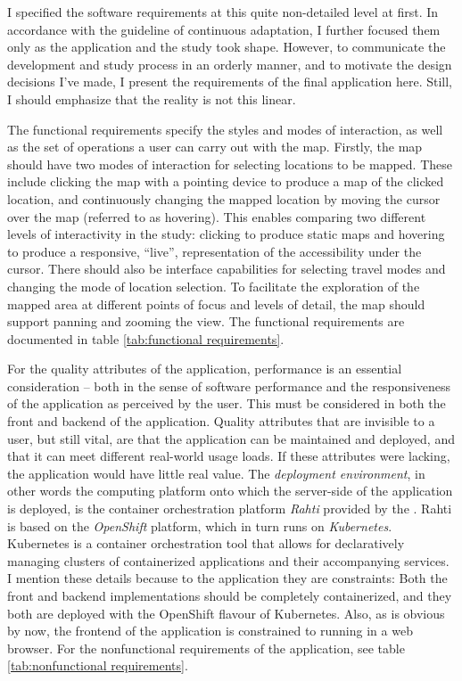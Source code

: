 I specified the software requirements at this quite non-detailed
level at first.
In accordance with the guideline of continuous adaptation,
\parencite{bec2001} I further focused them only as the application
and the study took shape.
However, to communicate the development and study process in an orderly manner,
and to motivate the design decisions I've made,
I present the requirements of the final application here.
Still, I should emphasize that the reality is not this linear.

The functional requirements specify the styles and modes of interaction,
as well as the set of operations a user can carry out with the map.
Firstly, the map should have two modes of interaction for selecting locations to be mapped.
These include clicking the map with a pointing device to produce a map of the clicked location,
and continuously changing the mapped location by moving the cursor over the map
(referred to as hovering).
This enables comparing two different levels of interactivity in the study:
clicking to produce static maps and hovering to produce
a responsive, \enquote{live},
representation of the accessibility under the cursor.
There should also be interface capabilities for selecting travel modes
and changing the mode of location selection.
To facilitate the exploration of the mapped area
at different points of focus and levels of detail,
the map should support panning and zooming the view.
The functional requirements are documented in table \ref{tab:functional requirements}.

For the quality attributes of the application,
performance is an essential consideration --
both in the sense of software performance
and the responsiveness of the application as perceived by the user.
This must be considered in both the front and backend of the application.
Quality attributes that are invisible to a user, but still vital,
are that the application can be maintained and deployed,
and that it can meet different real-world usage loads.
If these attributes were lacking,
the application would have little real value.
The \textit{deployment environment},
in other words the computing platform onto which the server-side of the application is deployed,
is the container orchestration platform \textit{Rahti} provided by the .
Rahti is based on the \textit{OpenShift} platform,
which in turn runs on \textit{Kubernetes}.
Kubernetes is a container orchestration tool
that allows for declaratively managing clusters
of containerized applications and their accompanying services.
I mention these details because to the application they are constraints:
Both the front and backend implementations should be completely containerized,
and they both are deployed with the OpenShift flavour of Kubernetes.
Also, as is obvious by now,
the frontend of the application is constrained to running in a web browser.
For the nonfunctional requirements of the application,
see table \ref{tab:nonfunctional requirements}.

